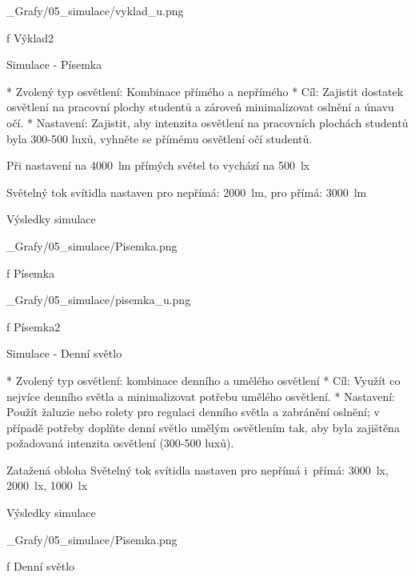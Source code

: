 \medskip {}
\picw=10cm _Grafy/05_simulace/vyklad_u.png
\caption/f Výklad2
\medskip

\sec Simulace - Písemka

\begitems
* Zvolený typ osvětlení: Kombinace přímého a nepřímého
* Cíl: Zajistit dostatek osvětlení na pracovní plochy studentů a zároveň minimalizovat oslnění a únavu očí.
* Nastavení: Zajistit, aby intenzita osvětlení na pracovních plochách studentů byla 300-500 luxů, vyhněte se přímému osvětlení očí studentů.
\enditems


\noindent Při nastavení na 4000~lm přímých světel to vychází na 500~lx

\noindent Světelný tok svítidla nastaven pro nepřímá: 2000~lm, pro přímá: 3000~lm

\secc Výsledky simulace

\medskip {}
\picw=10cm _Grafy/05_simulace/Pisemka.png
\caption/f Písemka
\medskip

\medskip {}
\picw=10cm _Grafy/05_simulace/pisemka_u.png
\caption/f Písemka2
\medskip

\sec Simulace - Denní světlo

\begitems
* Zvolený typ osvětlení: kombinace denního a umělého osvětlení
* Cíl: Využít co nejvíce denního světla a minimalizovat potřebu umělého osvětlení.
* Nastavení: Použít žaluzie nebo rolety pro regulaci denního světla a zabránění oslnění; v případě potřeby doplňte denní světlo umělým osvětlením tak, aby byla zajištěna požadovaná intenzita osvětlení (300-500 luxů).
\enditems

\noindent Zatažená obloha
\noindent Světelný tok svítidla nastaven pro nepřímá i~přímá: 3000~lx, 2000~lx, 1000~lx

\secc Výsledky simulace

\medskip {}
\picw=10cm _Grafy/05_simulace/Pisemka.png
\caption/f Denní světlo
\medskip




